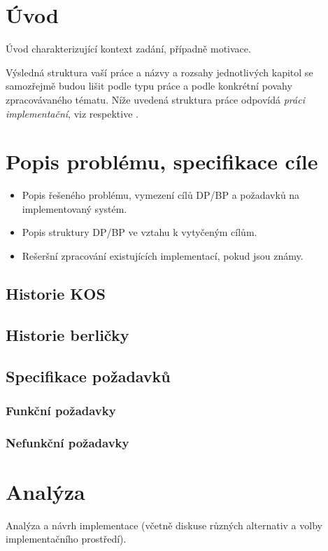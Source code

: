 \documentclass[11pt,oneside,a4paper]{book}
\begin{document}
\chapter{Úvod}
Úvod charakterizující kontext zadání, případně motivace.

Výsledná struktura vaší práce a názvy a rozsahy jednotlivých kapitol se samozřejmě budou lišit podle typu práce a podle konkrétní povahy zpracovávaného tématu. Níže uvedená struktura práce odpovídá \textit{práci implementační}, viz \cite{infodp} respektive \cite{infobp}. 




\chapter{Popis problému, specifikace cíle}

\begin{itemize}
\item Popis řešeného problému, vymezení cílů DP/BP a požadavků na implementovaný systém.
\item Popis struktury DP/BP ve vztahu k vytyčeným cílům.
\item Rešeršní zpracování existujících implementací, pokud jsou známy.
\end{itemize}
\section{Historie KOS}
\section{Historie berličky}

\section{Specifikace požadavků}
\subsection{Funkční požadavky}
\subsection{Nefunkční požadavky}


\chapter{Analýza}
Analýza a návrh implementace (včetně diskuse různých alternativ a volby implementačního prostředí).
\end{document}
